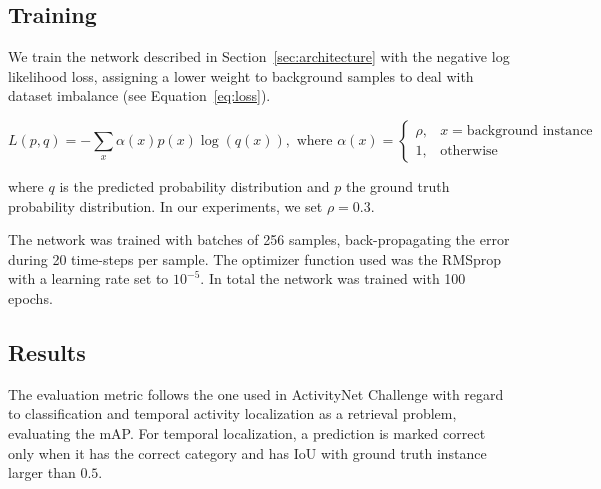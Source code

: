 \documentclass{article}
\begin{document}
\subsection{Training}
We train the network described in Section~\ref{sec:architecture} with the negative log likelihood loss, assigning a lower weight to background samples to deal with dataset imbalance (see Equation~\ref{eq:loss}).

\begin{equation}
    L(p,q) = - \sum_x \alpha(x) p(x) \log (q(x)), \text{ where } \alpha(x) =
    \begin{cases}
        \rho, & x = \text{background instance}\\
        1,    & \text{otherwise}
    \end{cases}
    \label{eq:loss}
\end{equation}

where $q$ is the predicted probability distribution and $p$ the ground truth probability distribution. In our experiments, we set $\rho = 0.3$.

The network was trained with batches of 256 samples, back-propagating the error during 20 time-steps per sample.
The optimizer function used was the RMSprop~\cite{dauphin2015rmsprop} with a learning rate set to $10^{-5}$. In total the network was trained with 100 epochs.



\subsection{Results}

The evaluation metric follows the one used in ActivityNet Challenge with regard to classification and temporal activity localization as a retrieval problem, evaluating the mAP.
For temporal localization, a prediction is marked correct only when it has the correct category and has IoU with ground truth instance larger than $0.5$.
\end{document}
